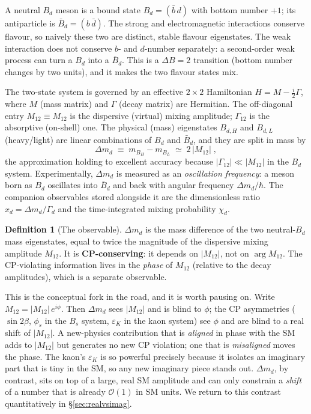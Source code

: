 \documentclass[11pt]{article}
\newcommand{\Mtwelve}{M_{12}}
\newcommand{\Bd}{B_d}
\newcommand{\Bdbar}{\bar B_d}
\newcommand{\dmd}{\Delta m_d}
\newcommand{\epsK}{\varepsilon_K}
\theoremstyle{definition}
\newtheorem{definition}{Definition}
\begin{document}
A neutral $B_d$ meson is a bound state $\Bd=(\bar b\, d)$ with bottom number
$+1$; its antiparticle is $\Bdbar=(b\,\bar d)$. The strong and electromagnetic
interactions conserve flavour, so naively these two are distinct, stable
flavour eigenstates. The weak interaction does not conserve $b$- and $d$-number
separately: a second-order weak process can turn a $\Bd$ into a $\Bdbar$. This is
a $\Delta B = 2$ transition (bottom number changes by two units), and it makes
the two flavour states mix.

The two-state system is governed by an effective $2\times2$ Hamiltonian
$H = M - \tfrac{i}{2}\Gamma$, where $M$ (mass matrix) and $\Gamma$ (decay matrix)
are Hermitian. The off-diagonal entry $\Mtwelve \equiv M_{12}$ is the dispersive
(virtual) mixing amplitude; $\Gamma_{12}$ is the absorptive (on-shell) one. The
physical (mass) eigenstates $B_{d,H}$ and $B_{d,L}$ (heavy/light) are linear combinations of
$\Bd$ and $\Bdbar$, and they are split in mass by
\begin{equation}
\boxed{\;\dmd \;\equiv\; m_{B_H} - m_{B_L} \;\simeq\; 2\,|\Mtwelve|\;,\;}
\label{eq:dmddef}
\end{equation}
the approximation holding to excellent accuracy because $|\Gamma_{12}|\ll
|\Mtwelve|$ in the $B_d$ system. Experimentally, $\dmd$ is measured as an
\emph{oscillation frequency}: a meson born as $\Bd$ oscillates into $\Bdbar$ and
back with angular frequency $\dmd/\hbar$. The companion observables stored
alongside it are the dimensionless ratio $x_d = \dmd/\Gamma_d$ and the
time-integrated mixing probability $\chi_d$.

\begin{definition}[The observable]
$\dmd$ is the mass difference of the two neutral-$B_d$ mass eigenstates, equal to
twice the magnitude of the dispersive mixing amplitude $\Mtwelve$. It is
\textbf{CP-conserving}: it depends on $|\Mtwelve|$, not on $\arg\Mtwelve$. The
CP-violating information lives in the \emph{phase} of $\Mtwelve$ (relative to the
decay amplitudes), which is a separate observable.
\end{definition}

This is the conceptual fork in the road, and it is worth pausing on. Write
$\Mtwelve = |\Mtwelve|\,e^{i\phi}$. Then $\dmd$ sees $|\Mtwelve|$ and is blind to
$\phi$; the CP asymmetries ($\sin 2\beta$, $\phi_s$ in the $B_s$ system, $\epsK$
in the kaon system) see $\phi$ and are blind to a real shift of $|\Mtwelve|$. A
new-physics contribution that is \emph{aligned} in phase with the SM adds to
$|\Mtwelve|$ but generates no new CP violation; one that is \emph{misaligned}
moves the phase. The kaon's $\epsK$ is so powerful precisely because it isolates
an imaginary part that is tiny in the SM, so any new imaginary piece stands out.
$\dmd$, by contrast, sits on top of a large, real SM amplitude and can only
constrain a \emph{shift} of a number that is already $\mathcal{O}(1)$ in SM
units. We return to this contrast quantitatively in
\S\ref{sec:realvsimag}.
\end{document}
